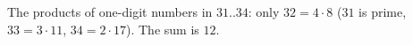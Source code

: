 The products of one-digit numbers in $31..34$: only $32=4\cdot8$ ($31$ is prime, $33=3\cdot11$, $34=2\cdot17$). The sum is $\boxed{12}$.
